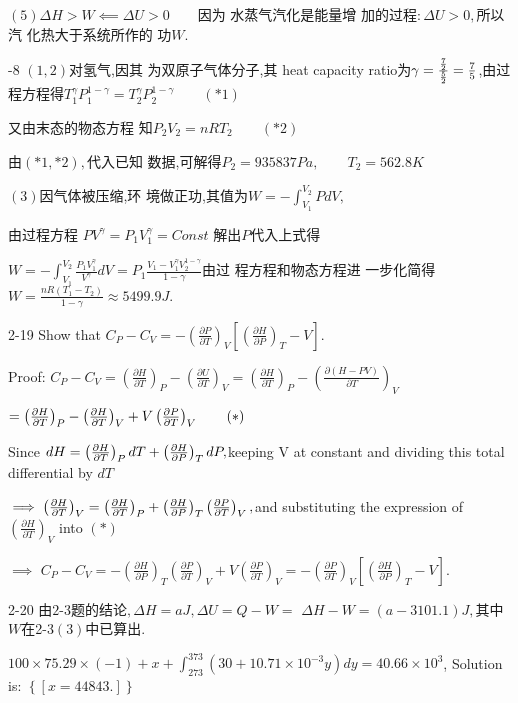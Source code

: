 \documentclass{article}
\begin{document}
$\left( 5\right) \Delta H>W\impliedby \Delta U>0\qquad $因为%
水蒸气汽化是能量增%
加的过程$:\Delta U>0,$所以汽%
化热大于系统所作的%
功$W.$

-8 $\left( 1,2\right) $对氢气,因其%
为双原子气体分子,其%
heat capacity ratio为$\gamma =\frac{\frac{7}{2}}{\frac{5}{2}}=\frac{7}{%
5}$,由过程方程得$T_{1}^{\gamma
}P_{1}^{1-\gamma }=T_{2}^{\gamma }P_{2}^{1-\gamma }\qquad \left( \ast
1\right) $

又由末态的物态方程%
知\qquad $P_{2}V_{2}=nRT_{2}\qquad \left( \ast 2\right) $

由$\left( \ast 1,\ast 2\right) ,$代入已知%
数据,可解得\qquad $P_{2}=935837\unit{Pa}%
,\qquad T_{2}=562.8\unit{K}$

$\left( 3\right) $因气体被压缩,环%
境做正功,其值为$%
W=-\int_{V_{1}}^{V_{2}}PdV,$

由过程方程 $PV^{\gamma }=P_{1}V_{1}^{\gamma
}=Const$ 解出$P$代入上式得

$W=-\int_{V_{1}}^{V_{2}}\frac{P_{1}V_{1}^{\gamma }}{V^{\gamma }}dV=P_{1}%
\frac{V_{1}-V_{1}^{\gamma }V_{2}^{1-\gamma }}{1-\gamma }$由过%
程方程和物态方程进%
一步化简得$W=\frac{nR\left( T_{1}-T_{2}\right) 
}{1-\gamma }\approx 5499.9\unit{J}.$

2-19 Show that $C_{P}-C_{V}=-\left( \frac{\partial P}{\partial T}\right) _{V}%
\left[ \left( \frac{\partial H}{\partial P}\right) _{T}-V\right] .$

Proof: $C_{P}-C_{V}=\left( \frac{\partial H}{\partial T}\right) _{P}-\left( 
\frac{\partial U}{\partial T}\right) _{V}=\left( \frac{\partial H}{\partial T%
}\right) _{P}-\left( \frac{\partial \left( H-PV\right) }{\partial T}\right)
_{V}$

$=\left( \frac{\partial H}{\partial T}\right) _{P}-\left( \frac{\partial H}{%
\partial T}\right) _{V}+V\left( \frac{\partial P}{\partial T}\right)
_{V}\qquad \left( \ast \right) $

Since $dH=\left( \frac{\partial H}{\partial T}\right) _{P}dT+\left( \frac{%
\partial H}{\partial P}\right) _{T}dP,$keeping V at constant and dividing
this total differential by $dT$

$\implies \left( \frac{\partial H}{\partial T}\right) _{V}=\left( \frac{%
\partial H}{\partial T}\right) _{P}+\left( \frac{\partial H}{\partial P}%
\right) _{T}\left( \frac{\partial P}{\partial T}\right) _{V},$and
substituting the expression of $\left( \frac{\partial H}{\partial T}\right)
_{V}$ into $\left( \ast \right) $

$\implies $ $C_{P}-C_{V}=-\left( \frac{\partial H}{\partial P}\right)
_{T}\left( \frac{\partial P}{\partial T}\right) _{V}+V\left( \frac{\partial P%
}{\partial T}\right) _{V}=-\left( \frac{\partial P}{\partial T}\right) _{V}%
\left[ \left( \frac{\partial H}{\partial P}\right) _{T}-V\right] .$

2-20 由$2$-3题的结论$,\Delta H=a\unit{J}%
,\Delta U=Q-W=$ $\Delta H-W=\left( a-3101.1\right) \unit{J},$其中%
$W$在2-3$\left( 3\right) $中已算出$.$

$100\times 75.29\times (-1)+x+\int_{273}^{373}(30+10.71\times
10^{-3}y)dy=40.66\times 10^{3}$, Solution is: $\left\{ \left[ x=44843.\right]
\right\} $
\end{document}
